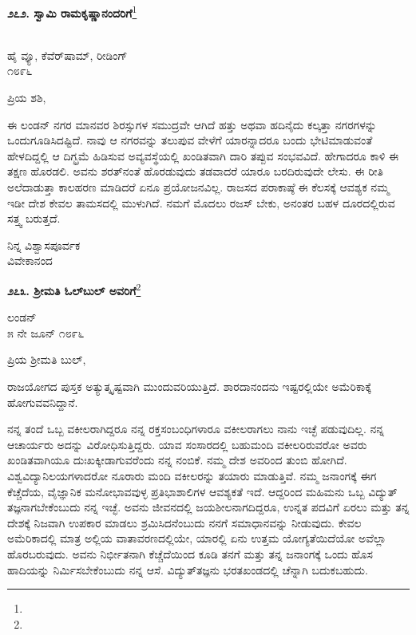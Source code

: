 \begin{center}
\textbf{೨೭೨. ಸ್ವಾಮಿ ರಾಮಕೃಷ್ಣಾನಂದರಿಗೆ}\footnote{}
\end{center}

\begin{flushright}
\\ಹೈ ವ್ಯೂ, ಕೆವೆರ್‌ಷಾಮ್, ರೀಡಿಂಗ್\\೧೮೯೬
\end{flushright}

\noindent
ಪ್ರಿಯ ಶಶಿ,

ಈ ಲಂಡನ್ ನಗರ ಮಾನವರ ಶಿರಸ್ಸುಗಳ ಸಮುದ್ರವೇ ಆಗಿದೆ\enginline{-} ಹತ್ತು ಅಥವಾ ಹದಿನೈದು ಕಲ್ಕತ್ತಾ ನಗರಗಳನ್ನು ಒಂದುಗೂಡಿಸಿದಷ್ಟಿದೆ. ನಾವು ಆ ನಗರವನ್ನು ತಲುಪುವ ವೇಳೆಗೆ ಯಾರನ್ನಾದರೂ ಬಂದು ಭೇಟಿಮಾಡುವಂತೆ ಹೇಳದಿದ್ದಲ್ಲಿ ಆ ದಿಗ್ಭ್ರಮೆ ಹಿಡಿಸುವ ಅವ್ಯವಸ್ಥೆಯಲ್ಲಿ ಖಂಡಿತವಾಗಿ ದಾರಿ ತಪ್ಪುವ ಸಂಭವವಿದೆ. ಹೇಗಾದರೂ ಕಾಳಿ ಈ ತಕ್ಷಣ ಹೊರಡಲಿ. ಅವನು ಶರತ್‌ನಂತೆ ಹೊರಡುವುದು ತಡವಾದರೆ ಯಾರೂ ಬರದಿರುವುದೇ ಲೇಸು. ಈ ರೀತಿ ಅಲೆದಾಡುತ್ತಾ ಕಾಲಹರಣ ಮಾಡಿದರೆ ಏನೂ ಪ್ರಯೋಜನವಿಲ್ಲ. ರಾಜಸದ ಪರಾಕಾಷ್ಠೆ ಈ ಕೆಲಸಕ್ಕೆ ಆವಶ್ಯಕ\enginline{-} ನಮ್ಮ ಇಡೀ ದೇಶ ಕೇವಲ ತಾಮಸದಲ್ಲಿ ಮುಳುಗಿದೆ. ನಮಗೆ ಮೊದಲು ರಜಸ್ ಬೇಕು, ಅನಂತರ ಬಹಳ ದೂರದಲ್ಲಿರುವ ಸತ್ತ್ವ ಬರುತ್ತದೆ.

{\flushright
ನಿನ್ನ ವಿಶ್ವಾಸಪೂರ್ವಕ\\ವಿವೇಕಾನಂದ\par}

\begin{center}
\textbf{೨೭೩. ಶ‍್ರೀಮತಿ ಓಲ್‌ಬುಲ್‌ ಅವರಿಗೆ}\footnote{}
\end{center}

\begin{flushright}
ಲಂಡನ್\\೫ ನೇ ಜೂನ್ ೧೮೯೬
\end{flushright}

\noindent
ಪ್ರಿಯ ಶ‍್ರೀಮತಿ ಬುಲ್,

ರಾಜಯೋಗದ ಪುಸ್ತಕ ಅತ್ಯುತ್ಕೃಷ್ಟವಾಗಿ ಮುಂದುವರಿಯುತ್ತಿದೆ. ಶಾರದಾನಂದನು ಇಷ್ಟರಲ್ಲಿಯೇ ಅಮೆರಿಕಾಕ್ಕೆ ಹೋಗುವವನಿದ್ದಾನೆ.

ನನ್ನ ತಂದೆ ಒಬ್ಬ ವಕೀಲರಾಗಿದ್ದರೂ ನನ್ನ ರಕ್ತಸಂಬಂಧಿಗಳಾರೂ ವಕೀಲರಾಗಲು ನಾನು ಇಚ್ಛೆ ಪಡುವುದಿಲ್ಲ. ನನ್ನ ಆಚಾರ್ಯರು ಅದನ್ನು ವಿರೋಧಿಸುತ್ತಿದ್ದರು. ಯಾವ ಸಂಸಾರದಲ್ಲಿ ಬಹುಮಂದಿ ವಕೀಲರಿರುವರೋ ಅವರು ಖಂಡಿತವಾಗಿಯೂ ದುಃಖ\break ಕ್ಕೀಡಾಗುವರೆಂದು ನನ್ನ ನಂಬಿಕೆ. ನಮ್ಮ ದೇಶ ಅವರಿಂದ ತುಂಬಿ ಹೋಗಿದೆ. ವಿಶ್ವವಿದ್ಯಾನಿಲಯಗಳಾದರೋ ನೂರಾರು ಮಂದಿ ವಕೀಲರನ್ನು ತಯಾರು ಮಾಡುತ್ತಿವೆ. ನಮ್ಮ ಜನಾಂಗಕ್ಕೆ ಈಗ ಕೆಚ್ಚೆದೆಯ, ವೈಜ್ಞಾನಿಕ ಮನೋಭಾವವುಳ್ಳ ಪ್ರತಿಭಾಶಾಲಿಗಳ ಆವಶ್ಯಕತೆ ಇದೆ. ಆದ್ದರಿಂದ ಮಹಿಮನು ಒಬ್ಬ ವಿದ್ಯುತ್ ತಜ್ಞನಾಗಬೇಕೆಂಬುದು ನನ್ನ ಇಚ್ಛೆ. ಅವನು ಜೀವನದಲ್ಲಿ ಜಯಶೀಲನಾಗದಿದ್ದರೂ, ಉನ್ನತ ಪದವಿಗೆ ಏರಲು ಮತ್ತು ತನ್ನ ದೇಶಕ್ಕೆ ನಿಜವಾಗಿ ಉಪಕಾರ ಮಾಡಲು ಶ್ರಮಿಸಿದನೆಂಬುದು ನನಗೆ ಸಮಾಧಾನವನ್ನು ನೀಡುವುದು. ಕೇವಲ ಅಮೆರಿಕಾದಲ್ಲಿ ಮಾತ್ರ ಅಲ್ಲಿಯ ವಾತಾವರಣದಲ್ಲಿಯೇ, ಯಾರಲ್ಲಿ ಏನು ಉತ್ತಮ ಯೋಗ್ಯತೆಯಿದೆಯೋ ಅವೆಲ್ಲಾ ಹೊರಬರುವುದು. ಅವನು ನಿರ್ಭೀತನಾಗಿ ಕೆಚ್ಚೆದೆಯಿಂದ ಕೂಡಿ ತನಗೆ ಮತ್ತು ತನ್ನ ಜನಾಂಗಕ್ಕೆ ಒಂದು ಹೊಸ ಹಾದಿಯನ್ನು ನಿರ್ಮಿಸಬೇಕೆಂಬುದು ನನ್ನ ಆಸೆ. ವಿದ್ಯುತ್‌ತಜ್ಞನು ಭರತಖಂಡದಲ್ಲಿ ಚೆನ್ನಾಗಿ ಬದುಕಬಹುದು.


